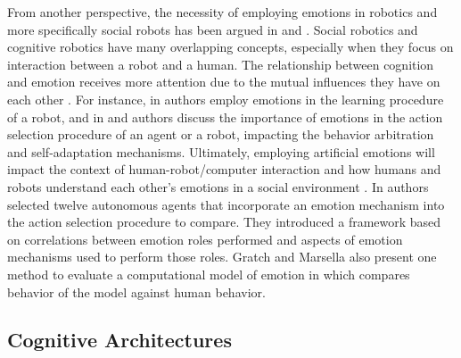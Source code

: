 \documentclass[12pt]{report}
\begin{document}
From another perspective, the necessity of employing emotions in robotics and
more specifically social robots has been argued in
\cite{pfeifer:robotics-emotion} and \cite{sloman:robots-emotion}. Social
robotics and cognitive robotics have many overlapping concepts, especially when
they focus on interaction between a robot and a human. The relationship between
cognition and emotion receives more attention due to the mutual influences they
have on each other
\cite{morse:robotic-modelling-cognition,scheutz:emotional-states-behavior}. For
instance, in \cite{gadanho:learning-emotions} authors employ emotions in the
learning procedure of a robot, and in \cite{broekens:affect-action-selection} and
\cite{scheutz:emotion-action-behavior} authors discuss the importance of
emotions in the action selection procedure of an agent or a robot, impacting
the behavior arbitration and self-adaptation mechanisms. Ultimately, employing
artificial emotions will impact the context of human-robot/computer interaction
\cite{hudlicka:affect-HRI} and how humans and robots understand each other's
emotions in a social environment
\cite{kirby:social-robots,canamero:emotion-robot-perspective}. In
\cite{rumbell:comparative-emotions-functions} authors selected twelve autonomous
agents that incorporate an emotion mechanism into the action selection procedure
to compare. They introduced a framework based on correlations between emotion
roles performed and aspects of emotion mechanisms used to perform those roles.
Gratch and Marsella also present one method to evaluate a computational model of
emotion in \cite{gratch:evaluating} which compares behavior of the model against
human behavior.

\subsection{Cognitive Architectures}
\end{document}
